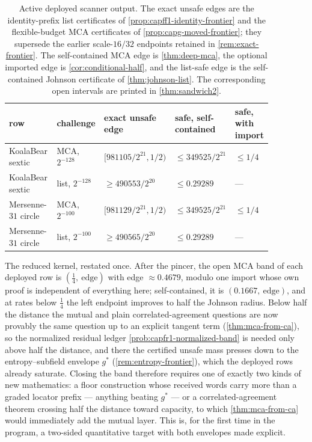 \documentclass[11pt]{article}
\theoremstyle{definition}
\theoremstyle{remark}
\begin{document}
\begin{table}[t]
\centering\scriptsize
\setlength{\tabcolsep}{2pt}
\begin{tabular}{@{}p{0.18\linewidth}p{0.13\linewidth}p{0.24\linewidth}p{0.18\linewidth}p{0.14\linewidth}@{}}
\toprule
row & challenge & exact unsafe edge & safe, self-contained & safe, with import \\
\midrule
KoalaBear sextic & MCA, $2^{-128}$ & $[981105/2^{21},1/2)$ & $\le349525/2^{21}$ & $\le1/4$ \\
KoalaBear sextic & list, $2^{-128}$ & $\ge490553/2^{20}$ & $\le0.29289$ & --- \\
Mersenne-$31$ circle & MCA, $2^{-100}$ & $[981129/2^{21},1/2)$ & $\le349525/2^{21}$ & $\le1/4$ \\
Mersenne-$31$ circle & list, $2^{-100}$ & $\ge490565/2^{20}$ & $\le0.29289$ & --- \\
\bottomrule
\end{tabular}
\caption{Active deployed scanner output.  The exact unsafe edges are the identity-prefix list certificates of \cref{prop:capff1-identity-frontier} and the flexible-budget MCA certificates of \cref{prop:capg-moved-frontier}; they supersede the earlier scale-$16/32$ endpoints retained in \cref{rem:exact-frontier}.  The self-contained MCA edge is \cref{thm:deep-mca}, the optional imported edge is \cref{cor:conditional-half}, and the list-safe edge is the self-contained Johnson certificate of \cref{thm:johnson-list}.  The corresponding open intervals are printed in \cref{thm:sandwich2}.}
\label{tab:scanner2}
\end{table}

The reduced kernel, restated once. After the pincer, the open MCA band of each deployed row is $(\tfrac14,\ \text{edge})$ with edge $\approx0.4679$, modulo one import whose own proof is independent of everything here; self-contained, it is $(0.1667,\ \text{edge})$, and at rates below $\tfrac14$ the left endpoint improves to half the Johnson radius. Below half the distance the mutual and plain correlated-agreement questions are now provably the same question up to an explicit tangent term (\cref{thm:mca-from-ca}), so the normalized residual ledger \cref{prob:capfr1-normalized-band} is needed only above half the distance, and there the certified unsafe mass presses down to the entropy--subfield envelope $g^*$ (\cref{rem:entropy-frontier}), which the deployed rows already saturate. Closing the band therefore requires one of exactly two kinds of new mathematics: a floor construction whose received words carry more than a graded locator prefix --- anything beating $g^*$ --- or a correlated-agreement theorem crossing half the distance toward capacity, to which \cref{thm:mca-from-ca} would immediately add the mutual layer. This is, for the first time in the program, a two-sided quantitative target with both envelopes made explicit.
\end{document}
